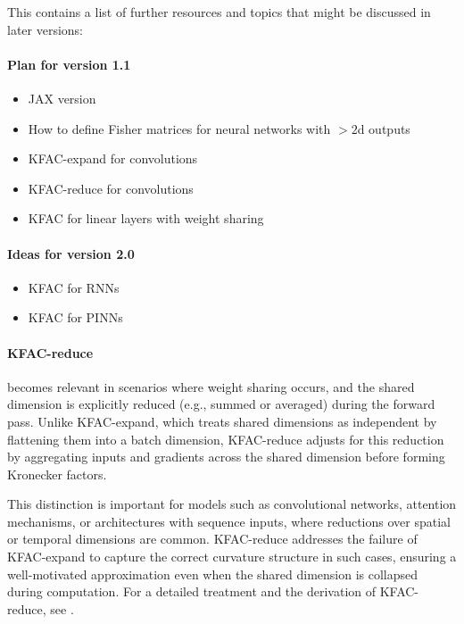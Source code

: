 This contains a list of further resources and topics that might be discussed in later versions:

\paragraph{Plan for version 1.1}
\begin{itemize}
\item JAX version
\item How to define Fisher matrices for neural networks with $>2$d outputs
\item KFAC-expand for convolutions \cite{grosse2016kroneckerfactored}
\item KFAC-reduce for convolutions \cite{eschenhagen2023kroneckerfactored}
\item KFAC for linear layers with weight sharing \cite{eschenhagen2023kroneckerfactored}
\end{itemize}

\paragraph{Ideas for version 2.0}
\begin{itemize}
  \item KFAC for RNNs \cite{martens2018kroneckerfactored}
    \item KFAC for PINNs \cite{dangel2024kroneckerfactored}
\end{itemize}

\paragraph{KFAC-reduce} becomes relevant in scenarios where weight sharing occurs, and the shared dimension is explicitly reduced (e.g., summed or averaged) during the forward pass. Unlike KFAC-expand, which treats shared dimensions as independent by flattening them into a batch dimension, KFAC-reduce adjusts for this reduction by aggregating inputs and gradients across the shared dimension before forming Kronecker factors.

This distinction is important for models such as convolutional networks, attention mechanisms, or architectures with sequence inputs, where reductions over spatial or temporal dimensions are common. KFAC-reduce addresses the failure of KFAC-expand to capture the correct curvature structure in such cases, ensuring a well-motivated approximation even when the shared dimension is collapsed during computation. For a detailed treatment and the derivation of KFAC-reduce, see \citet{eschenhagen2023kroneckerfactored}.
